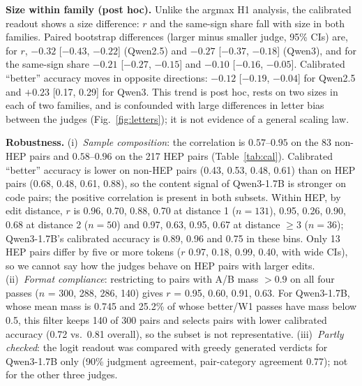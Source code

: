 \documentclass[conference]{IEEEtran}
\begin{document}
\textbf{Size within family (post hoc).} Unlike the argmax H1 analysis, the calibrated readout shows a size
difference: $r$ and the same-sign share fall with size in both families. Paired bootstrap differences (larger
minus smaller judge, 95\% CIs) are, for $r$, $-0.32$ [$-0.43$, $-0.22$] (Qwen2.5) and $-0.27$ [$-0.37$, $-0.18$]
(Qwen3), and for the same-sign share $-0.21$ [$-0.27$, $-0.15$] and $-0.10$ [$-0.16$, $-0.05$]. Calibrated ``better'' accuracy moves in opposite directions: $-0.12$ [$-0.19$, $-0.04$] for
Qwen2.5 and $+0.23$ [0.17, 0.29] for Qwen3. This trend is post hoc, rests on two sizes in each of two families,
and is confounded with large differences in letter bias between the judges (Fig.~\ref{fig:letters}); it is not
evidence of a general scaling law.

\textbf{Robustness.} (i)~\emph{Sample composition}: the correlation is $0.57$--$0.95$ on the 83 non-HEP pairs
and $0.58$--$0.96$ on the 217 HEP pairs (Table~\ref{tab:cal}). Calibrated ``better'' accuracy is lower on
non-HEP pairs (0.43, 0.53, 0.48, 0.61) than on HEP pairs (0.68, 0.48, 0.61, 0.88), so the content signal of
Qwen3-1.7B is stronger on code pairs; the positive correlation is present in both subsets. Within HEP, by edit
distance, $r$ is 0.96, 0.70, 0.88, 0.70 at distance 1 ($n=131$), 0.95, 0.26, 0.90, 0.68 at distance 2 ($n=50$)
and 0.97, 0.63, 0.95, 0.67 at distance $\ge3$ ($n=36$); Qwen3-1.7B's calibrated accuracy is 0.89, 0.96 and 0.75 in
these bins. Only 13 HEP pairs differ by five or more tokens ($r$ 0.97, 0.18, 0.99, 0.40, with wide CIs), so we
cannot say how the judges behave on HEP pairs with larger edits. (ii)~\emph{Format compliance}:
restricting to pairs with A/B mass $>0.9$ on all four passes ($n$ = 300, 288, 286, 140) gives $r$ = 0.95, 0.60,
0.91, 0.63. For Qwen3-1.7B, whose mean mass is 0.745 and 25.2\% of whose better/W1 passes have mass below 0.5,
this filter keeps 140 of 300 pairs and selects pairs with lower calibrated accuracy (0.72 vs.\ 0.81 overall), so
the subset is not representative. (iii)~\emph{Partly checked}: the logit readout was compared with greedy generated verdicts for Qwen3-1.7B only
(90\% judgment agreement, pair-category agreement 0.77); not for the other three judges.
\end{document}
